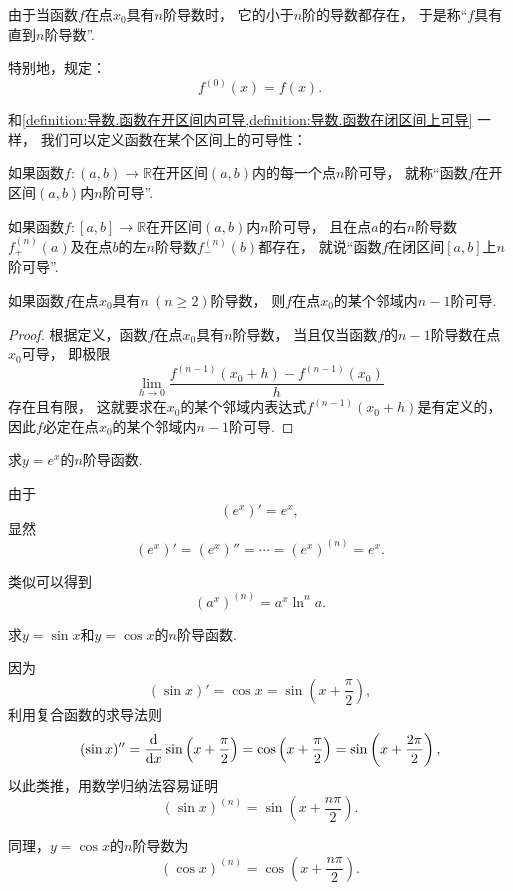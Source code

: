 由于当函数\(f\)在点\(x_0\)具有\(n\)阶导数时，
它的小于\(n\)阶的导数都存在，
于是称“\(f\)具有直到\(n\)阶导数”.

特别地，规定：\begin{equation}
	f^{(0)}(x) = f(x).
\end{equation}

和\cref{definition:导数.函数在开区间内可导,definition:导数.函数在闭区间上可导} 一样，
我们可以定义函数在某个区间上的可导性：
\begin{definition}
如果函数\(f\colon(a,b)\to\mathbb{R}\)在开区间\((a,b)\)内的每一个点\(n\)阶可导，
就称“函数\(f\)在开区间\((a,b)\)内\(n\)阶可导”.
\end{definition}
\begin{definition}
如果函数\(f\colon[a,b]\to\mathbb{R}\)在开区间\((a,b)\)内\(n\)阶可导，
且在点\(a\)的右\(n\)阶导数\(f^{(n)}_+(a)\)及在点\(b\)的左\(n\)阶导数\(f^{(n)}_-(b)\)都存在，
就说“函数\(f\)在闭区间\([a,b]\)上\(n\)阶可导”.
\end{definition}

\begin{proposition}
如果函数\(f\)在点\(x_0\)具有\(n\ (n\geq2)\)阶导数，
则\(f\)在点\(x_0\)的某个邻域内\(n-1\)阶可导.
\begin{proof}
根据定义，函数\(f\)在点\(x_0\)具有\(n\)阶导数，
当且仅当函数\(f\)的\(n-1\)阶导数在点\(x_0\)可导，
即极限\[
	\lim_{h\to0} \frac{f^{(n-1)}(x_0+h) - f^{(n-1)}(x_0)}{h}
\]存在且有限，
这就要求在\(x_0\)的某个邻域内表达式\(f^{(n-1)}(x_0+h)\)是有定义的，
因此\(f\)必定在点\(x_0\)的某个邻域内\(n-1\)阶可导.
\end{proof}
\end{proposition}

\begin{example}
求\(y = e^x\)的\(n\)阶导函数.
\begin{solution}
由于\[
	(e^x)' = e^x,
\]
显然\[
	(e^x)'
	= (e^x)''
	= \dotsb
	= (e^x)^{(n)}
	= e^x.
\]
\end{solution}
\end{example}
类似可以得到\[
	(a^x)^{(n)}
	= a^x \ln^n a.
\]

\begin{example}
求\(y = \sin x\)和\(y = \cos x\)的\(n\)阶导函数.
\begin{solution}
因为\[
	(\sin x)' = \cos x
	= \sin\left(x + \frac\pi2\right),
\]
利用复合函数的求导法则\[
	(\sin x)'' = \dv{x} \sin\left(x+\frac\pi2\right)
	= \cos\left(x+\frac\pi2\right)
	= \sin\left(x+\frac{2\pi}2\right),
\]
以此类推，用数学归纳法容易证明\[
	(\sin x)^{(n)}
	= \sin\left(x+\frac{n\pi}2\right).
\]
\end{solution}
\end{example}
同理，\(y = \cos x\)的\(n\)阶导数为\[
	(\cos x)^{(n)}
	= \cos\left(x+\frac{n\pi}2\right).
\]

